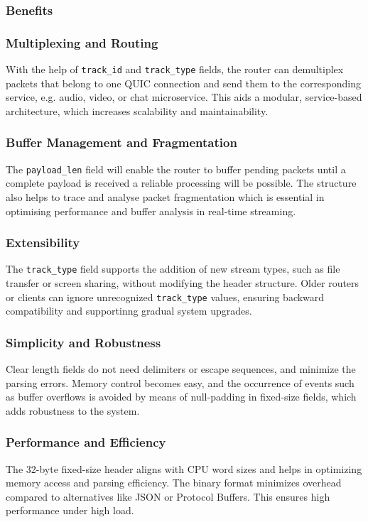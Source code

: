 {\subsubsection{Benefits}

\subsubsection{Multiplexing and Routing}
With the help of \texttt{track\_id} and \texttt{track\_type} fields, the router can demultiplex packets that belong to one QUIC connection and send them to the corresponding service, e.g. audio, video, or chat microservice. This aids a modular, service-based architecture, which increases scalability and maintainability.

\subsubsection{Buffer Management and Fragmentation}
The \texttt{payload\_len} field will enable the router to buffer pending packets until a complete payload is received a reliable processing will be possible. The structure also helps to trace and analyse packet fragmentation which is essential in optimising performance and buffer analysis in real-time streaming.

\subsubsection{Extensibility}
The \texttt{track\_type} field supports the addition of new stream types, such as file transfer or screen sharing, without modifying the header structure. Older routers or clients can ignore unrecognized \texttt{track\_type} values, ensuring backward compatibility and supportinng gradual system upgrades.

\subsubsection{Simplicity and Robustness}
Clear length fields do not need delimiters or escape sequences, and minimize the parsing errors. Memory control becomes easy, and the occurrence of events such as buffer overflows is avoided by means of null-padding in fixed-size fields, which adds robustness to the system.


\subsubsection{Performance and Efficiency}
The 32-byte fixed-size header aligns with CPU word sizes and helps in optimizing memory access and parsing efficiency. The binary format minimizes overhead compared to alternatives like JSON or Protocol Buffers. This ensures high performance under high load.





}

